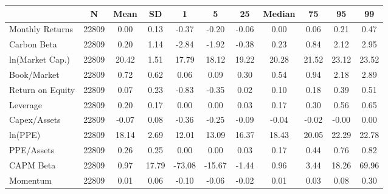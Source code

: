 {
\def\sym#1{\ifmmode^{#1}\else\(^{#1}\)\fi}
\begin{tabular}{l*{1}{cccccccccc}}
\toprule
                    &           N&        Mean&          SD&           1&           5&          25&      Median&          75&          95&          99\\
\midrule
Monthly Returns     &       22809&        0.00&        0.13&       -0.37&       -0.20&       -0.06&        0.00&        0.06&        0.21&        0.47\\
Carbon Beta         &       22809&        0.20&        1.14&       -2.84&       -1.92&       -0.38&        0.23&        0.84&        2.12&        2.95\\
ln(Market Cap.)     &       22809&       20.42&        1.51&       17.79&       18.12&       19.22&       20.28&       21.52&       23.12&       23.52\\
Book/Market         &       22809&        0.72&        0.62&        0.06&        0.09&        0.30&        0.54&        0.94&        2.18&        2.89\\
Return on Equity    &       22809&        0.07&        0.23&       -0.83&       -0.35&        0.02&        0.10&        0.18&        0.39&        0.51\\
Leverage            &       22809&        0.20&        0.17&        0.00&        0.00&        0.03&        0.17&        0.30&        0.56&        0.65\\
Capex/Assets        &       22809&       -0.07&        0.08&       -0.36&       -0.25&       -0.09&       -0.04&       -0.02&       -0.00&        0.00\\
ln(PPE)             &       22809&       18.14&        2.69&       12.01&       13.09&       16.37&       18.43&       20.05&       22.29&       22.78\\
PPE/Assets          &       22809&        0.26&        0.25&        0.00&        0.00&        0.03&        0.17&        0.44&        0.76&        0.82\\
CAPM Beta           &       22809&        0.97&       17.79&      -73.08&      -15.67&       -1.44&        0.96&        3.44&       18.26&       69.96\\
Momentum            &       22809&        0.01&        0.06&       -0.10&       -0.06&       -0.02&        0.01&        0.03&        0.08&        0.30\\
\bottomrule
\end{tabular}
}
